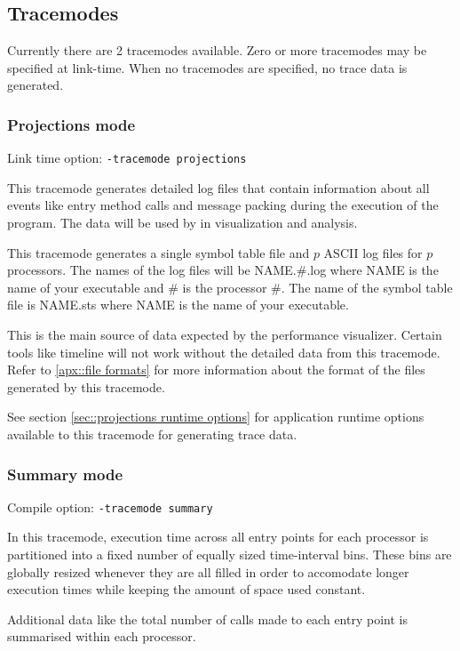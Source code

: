 \documentclass[10pt]{article}
\begin{document}
\subsection{Tracemodes}
\label{sec::trace modules}

Currently there are 2 tracemodes available. Zero or more tracemodes
may be specified at link-time. When no tracemodes are specified, no
trace data is generated.

\subsubsection{Projections mode}

Link time option: {\tt -tracemode projections}

This tracemode generates detailed log files that contain information
about all \charmpp{} events like entry method calls and message
packing during the execution of the program.  The data will be used by
\projections{} in visualization and analysis.

This tracemode generates a single symbol table file and $p$ ASCII log
files for $p$ processors. The names of the log files will be
NAME.\#.log where NAME is the name of your executable and \# is the
processor \#. The name of the symbol table file is NAME.sts where NAME
is the name of your executable.

This is the main source of data expected by the performance
visualizer. Certain tools like timeline will not work without the
detailed data from this tracemode. Refer to \ref{apx::file
formats} for more information about the format of the files generated
by this tracemode.

See section \ref{sec::projections runtime options} for application runtime
options available to this tracemode for generating trace data.

\subsubsection{Summary mode}

Compile option: {\tt -tracemode summary}

In this tracemode, execution time across all entry points for each
processor is partitioned into a fixed number of equally sized
time-interval bins. These bins are globally resized whenever they are
all filled in order to accomodate longer execution times while keeping
the amount of space used constant.

Additional data like the total number of calls made to each entry
point is summarised within each processor.
\end{document}
